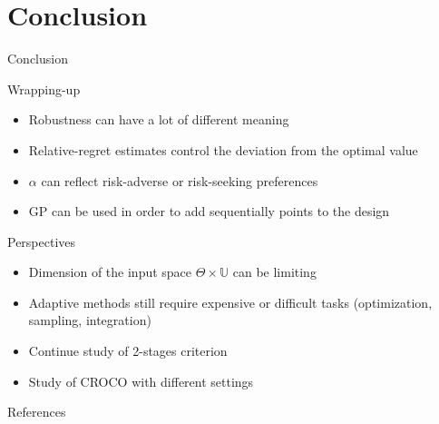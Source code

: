 \documentclass[10pt,aspectratio=169,usepdftitle=false]{beamer}
\newcommand{\Uspace}{\mathbb{U}}
\newcommand{\Kspace}{\Theta}
\begin{document}
\section{Conclusion}

\begin{frame}[label=conclusion]{Conclusion}
  
  \begin{block}{Wrapping-up}
    \begin{itemize}
    \item Robustness can have a lot of different meaning
    \item Relative-regret estimates control the deviation from the optimal value 
    \item $\alpha$ can reflect risk-adverse or risk-seeking preferences
    \item GP can be used in order to add sequentially points to the design
    \end{itemize}
  \end{block}


  \begin{block}{Perspectives}
    \begin{itemize}
    \item Dimension of the input space $\Kspace \times \Uspace$ can be limiting
    \item Adaptive methods still require expensive or difficult tasks (optimization, sampling, integration)
    \item Continue study of 2-stages criterion
    \item Study of CROCO with different settings
    \end{itemize}
  \end{block}
\end{frame}


\begin{frame}[allowframebreaks]{References}
  \renewcommand{\bibsection}{}

  
\end{frame}

\appendix
\end{document}
